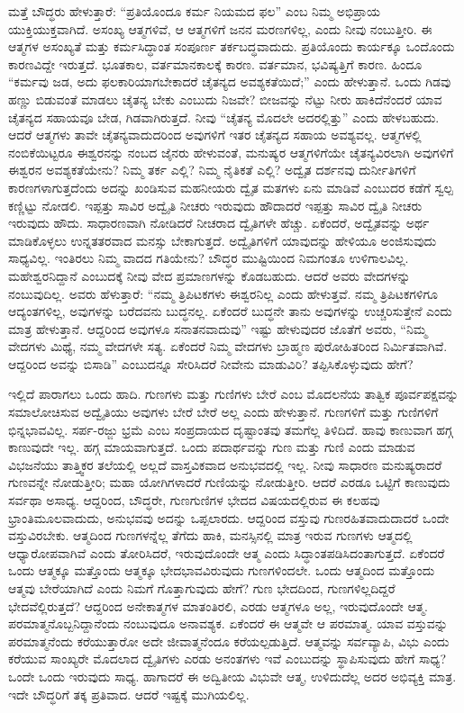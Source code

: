 ಮತ್ತೆ ಬೌದ್ಧರು ಹೇಳುತ್ತಾರೆ: “ಪ್ರತಿಯೊಂದೂ ಕರ್ಮ ನಿಯಮದ ಫಲ” ಎಂಬ ನಿಮ್ಮ ಅಭಿಪ್ರಾಯ ಯುಕ್ತಿಯುಕ್ತವಾಗಿದೆ. ಅಸಂಖ್ಯ ಆತ್ಮಗಳಿವೆ, ಆ ಆತ್ಮಗಳಿಗೆ ಜನನ ಮರಣಗಳಿಲ್ಲ, ಎಂದು ನೀವು ನಂಬುತ್ತೀರಿ. ಈ ಆತ್ಮಗಳ ಅಸಂಖ್ಯತೆ ಮತ್ತು ಕರ್ಮಸಿದ್ಧಾಂತ ಸಂಪೂರ್ಣ ತರ್ಕಬದ್ಧವಾದುದು. ಪ್ರತಿಯೊಂದು ಕಾರ್ಯಕ್ಕೂ ಒಂದೊಂದು ಕಾರಣವಿದ್ದೇ ಇರುತ್ತದೆ. ಭೂತಕಾಲ, ವರ್ತಮಾನಕಾಲಕ್ಕೆ ಕಾರಣ. ವರ್ತಮಾನ, ಭವಿಷ್ಯತ್ತಿಗೆ ಕಾರಣ. ಹಿಂದೂ “ಕರ್ಮವು ಜಡ, ಅದು ಫಲಕಾರಿಯಾಗಬೇಕಾದರೆ ಚೈತನ್ಯದ ಅವಶ್ಯಕತೆಯಿದೆ;” ಎಂದು ಹೇಳುತ್ತಾನೆ. ಒಂದು ಗಿಡವು ಹಣ್ಣು ಬಿಡುವಂತೆ ಮಾಡಲು ಚೈತನ್ಯ ಬೇಕು ಎಂಬುದು ನಿಜವೇ? ಬೀಜವನ್ನು ನೆಟ್ಟು ನೀರು ಹಾಕಿದೆನೆಂದರೆ ಯಾವ ಚೈತನ್ಯದ ಸಹಾಯವೂ ಬೇಡ, ಗಿಡವಾಗಿರುತ್ತದೆ. ನೀವು “ಚೈತನ್ಯ ಮೊದಲೇ ಅದರಲ್ಲಿತ್ತು” ಎಂದು ಹೇಳಬಹುದು. ಆದರೆ ಆತ್ಮಗಳು ತಾವೇ ಚೈತನ್ಯವಾದುದರಿಂದ ಅವುಗಳಿಗೆ ಇತರ ಚೈತನ್ಯದ ಸಹಾಯ ಅವಶ್ಯವಲ್ಲ. ಆತ್ಮಗಳಲ್ಲಿ ನಂಬಿಕೆಯಿಟ್ಟರೂ ಈಶ್ವರನನ್ನು ನಂಬದ ಜೈನರು ಹೇಳುವಂತೆ, ಮನುಷ್ಯರ ಆತ್ಮಗಳಿಗೆಯೇ ಚೈತನ್ಯವಿರಲಾಗಿ ಅವುಗಳಿಗೆ ಈಶ್ವರನ ಅವಶ್ಯಕತೆಯೇನು? ನಿಮ್ಮ ತರ್ಕ ಎಲ್ಲಿ? ನಿಮ್ಮ ನೈತಿಕತೆ ಎಲ್ಲಿ? ಅದ್ವೈತ ದರ್ಶನವು ದುರ್ನೀತಿಗಳಿಗೆ ಕಾರಣಗಳಾಗುತ್ತದೆಂದು ಅದನ್ನು ಖಂಡಿಸುವ ಮಹನೀಯರು ದ್ವೈತ ಮತಗಳು ಏನು ಮಾಡಿವೆ ಎಂಬುದರ ಕಡೆಗೆ ಸ್ವಲ್ಪ ಕಣ್ಣಿಟ್ಟು ನೋಡಲಿ. ಇಪ್ಪತ್ತು ಸಾವಿರ ಅದ್ವೈತಿ ನೀಚರು ಇರುವುದು ಹೌದಾದರೆ ಇಪ್ಪತ್ತು ಸಾವಿರ ದ್ವೈತಿ ನೀಚರು ಇರುವುದು ಹೌದು. ಸಾಧಾರಣವಾಗಿ ನೋಡಿದರೆ ನೀಚರಾದ ದ್ವೈತಿಗಳೇ ಹೆಚ್ಚು. ಏಕೆಂದರೆ, ಅದ್ವೈತವನ್ನು ಅರ್ಥ ಮಾಡಿಕೊಳ್ಳಲು ಉನ್ನತತರವಾದ ಮನಸ್ಸು ಬೇಕಾಗುತ್ತದೆ. ಅದ್ವೈತಿಗಳಿಗೆ ಯಾವುದನ್ನು ಹೇಳಿಯೂ ಅಂಜಿಸುವುದು ಸಾಧ್ಯವಿಲ್ಲ. ಇಂತಿರಲು ನಿಮ್ಮ ವಾದದ ಗತಿಯೇನು? ಬೌದ್ಧರ ಮುಷ್ಟಿಯಿಂದ ನಿಮಗಂತೂ ಉಳಿಗಾಲವಿಲ್ಲ. ಮಹೇಶ್ವರನಿದ್ದಾನೆ ಎಂಬುದಕ್ಕೆ ನೀವು ವೇದ ಪ್ರಮಾಣಗಳನ್ನು ಕೊಡಬಹುದು. ಆದರೆ ಅವರು ವೇದಗಳನ್ನು ನಂಬುವುದಿಲ್ಲ. ಅವರು ಹೆಳುತ್ತಾರೆ: “ನಮ್ಮ ತ್ರಿಪಿಟಕಗಳು ಈಶ್ವರನಿಲ್ಲ ಎಂದು ಹೇಳುತ್ತವೆ. ನಮ್ಮ ತ್ರಿಪಿಟಕಗಳಿಗೂ ಆದ್ಯಂತಗಳಿಲ್ಲ, ಅವುಗಳನ್ನು ಬರೆದವನು ಬುದ್ಧನಲ್ಲ. ಏಕೆಂದರೆ ಬುದ್ಧನೇ ತಾನು ಅವುಗಳನ್ನು ಉಚ್ಚರಿಸುತ್ತೇನೆ ಎಂದು ಮಾತ್ರ ಹೇಳುತ್ತಾನೆ. ಆದ್ದರಿಂದ ಅವುಗಳೂ ಸನಾತನವಾದುವು” ಇಷ್ಟು ಹೇಳುವುದರ ಜೊತೆಗೆ ಅವರು, “ನಿಮ್ಮ ವೇದಗಳು ಮಿಥ್ಯೆ, ನಮ್ಮ ವೇದಗಳೇ ಸತ್ಯ. ಏಕೆಂದರೆ ನಿಮ್ಮ ವೇದಗಳು ಬ್ರಾಹ್ಮಣ ಪುರೋಹಿತರಿಂದ ನಿರ್ಮಿತವಾಗಿವೆ. ಆದ್ದರಿಂದ ಅವನ್ನು ಬಿಸಾಡಿ” ಎಂಬುದನ್ನೂ ಸೇರಿಸಿದರೆ ನೀವೇನು ಮಾಡುವಿರಿ? ತಪ್ಪಿಸಿಕೊಳ್ಳುವುದು ಹೇಗೆ?

ಇಲ್ಲಿದೆ ಪಾರಾಗಲು ಒಂದು ಹಾದಿ. ಗುಣಗಳು ಮತ್ತು ಗುಣಿಗಳು ಬೇರೆ ಎಂಬ ಮೊದಲನೆಯ ತಾತ್ವಿಕ ಪೂರ್ವಪಕ್ಷವನ್ನು ಸಮಾಲೋಚಿಸುವ ಅದ್ವೈತಿಯು ಅವುಗಳು ಬೇರೆ ಬೇರೆ ಅಲ್ಲ ಎಂದು ಹೇಳುತ್ತಾನೆ. ಗುಣಗಳಿಗೆ ಮತ್ತು ಗುಣಿಗಳಿಗೆ ಭಿನ್ನಭಾವವಿಲ್ಲ. ಸರ್ಪ-ರಜ್ಜು ಭ್ರಮೆ ಎಂಬ ಸಂಪ್ರದಾಯದ ದೃಷ್ಟಾಂತವು ತಮಗೆಲ್ಲ ತಿಳಿದಿದೆ. ಹಾವು ಕಾಣುವಾಗ ಹಗ್ಗ ಕಾಣುವುದೇ ಇಲ್ಲ. ಹಗ್ಗ ಮಾಯವಾಗುತ್ತದೆ. ಒಂದು ಪದಾರ್ಥವನ್ನು ಗುಣ ಮತ್ತು ಗುಣಿ ಎಂದು ಮಾಡುವ ವಿಭಜನೆಯು ತಾತ್ತ್ವಿಕರ ತಲೆಯಲ್ಲಿ ಅಲ್ಲದೆ ವಾಸ್ತವಿಕವಾದ ಅನುಭವದಲ್ಲಿ ಇಲ್ಲ. ನೀವು ಸಾಧಾರಣ ಮನುಷ್ಯರಾದರೆ ಗುಣವನ್ನೇ ನೋಡುತ್ತೀರಿ; ಮಹಾ ಯೋಗಿಗಳಾದರೆ ಗುಣಿಯನ್ನು ನೋಡುತ್ತೀರಿ. ಆದರೆ ಎರಡೂ ಒಟ್ಟಿಗೆ ಕಾಣುವುದು ಸರ್ವಥಾ ಅಸಾಧ್ಯ. ಆದ್ದರಿಂದ, ಬೌದ್ಧರೇ, ಗುಣಗುಣಿಗಳ ಭೇದದ ವಿಷಯದಲ್ಲಿರುವ ಈ ಕಲಹವು ಭ್ರಾಂತಿಮೂಲವಾದುದು, ಅನುಭವವು ಅದನ್ನು ಒಪ್ಪಲಾರದು. ಆದ್ದರಿಂದ ವಸ್ತುವು ಗುಣರಹಿತವಾದುದಾದರೆ ಒಂದೇ ವಸ್ತುವಿರಬೇಕು. ಆತ್ಮದಿಂದ ಗುಣಗಳನ್ನೆಲ್ಲ ತೆಗೆದು ಹಾಕಿ, ಮನಸ್ಸಿನಲ್ಲಿ ಮಾತ್ರ ಇರುವ ಗುಣಗಳು ಆತ್ಮದಲ್ಲಿ ಆಧ್ಯಾರೋಪವಾಗಿವೆ ಎಂದು ತೋರಿಸಿದರೆ, ಇರುವುದೊಂದೇ ಆತ್ಮ ಎಂದು ಸಿದ್ಧಾಂತಪಡಿಸಿದಂತಾಗುತ್ತದೆ. ಏಕೆಂದರೆ ಒಂದು ಆತ್ಮಕ್ಕೂ ಮತ್ತೊಂದು ಆತ್ಮಕ್ಕೂ ಭೇದಭಾವವಿರುವುದು ಗುಣಗಳಿಂದಲೇ. ಒಂದು ಆತ್ಮದಿಂದ ಮತ್ತೊಂದು ಆತ್ಮವು ಬೇರೆಯಾಗಿದೆ ಎಂದು ನಿಮಗೆ ಗೊತ್ತಾಗುವುದು ಹೇಗೆ? ಗುಣ ಭೇದದಿಂದ, ಗುಣಗಳಿಲ್ಲದಿದ್ದರೆ ಭೇದವೆಲ್ಲಿರುತ್ತದೆ? ಆದ್ದರಿಂದ ಅನೇಕಾತ್ಮಗಳ ಮಾತಂತಿರಲಿ, ಎರಡು ಆತ್ಮಗಳೂ ಅಲ್ಲ, ಇರುವುದೊಂದೇ ಆತ್ಮ. ಪರಮಾತ್ಮನೊಬ್ಬನಿದ್ದಾನೆಂದು ನಂಬುವುದೂ ಅನಾವಶ್ಯಕ. ಏಕೆಂದರೆ ಈ ಆತ್ಮವೇ ಆ ಪರಮಾತ್ಮ. ಯಾವ ವಸ್ತುವನ್ನು ಪರಮಾತ್ಮನೆಂದು ಕರೆಯುತ್ತಾರೋ ಅದೇ ಜೀವಾತ್ಮನೆಂದೂ ಕರೆಯಲ್ಪಡುತ್ತಿದೆ. ಆತ್ಮವನ್ನು ಸರ್ವವ್ಯಾಪಿ, ವಿಭು ಎಂದು ಕರೆಯುವ ಸಾಂಖ್ಯರೇ ಮೊದಲಾದ ದ್ವೈತಿಗಳು ಎರಡು ಅನಂತಗಳು ಇವೆ ಎಂಬುದನ್ನು ಸ್ಥಾಪಿಸುವುದು ಹೇಗೆ ಸಾಧ್ಯ? ಒಂದೇ ಒಂದು ಇರುವುದು ಸಾಧ್ಯ. ಹಾಗಾದರೆ ಈ ಅದ್ವಿತೀಯ ವಿಭುವೇ ಆತ್ಮ, ಉಳಿದುದೆಲ್ಲ ಅದರ ಅಭಿವ್ಯಕ್ತಿ ಮಾತ್ರ. ಇದೇ ಬೌದ್ಧರಿಗೆ ತಕ್ಕ ಪ್ರತಿವಾದ. ಆದರೆ ಇಷ್ಟಕ್ಕೆ ಮುಗಿಯಲಿಲ್ಲ.

